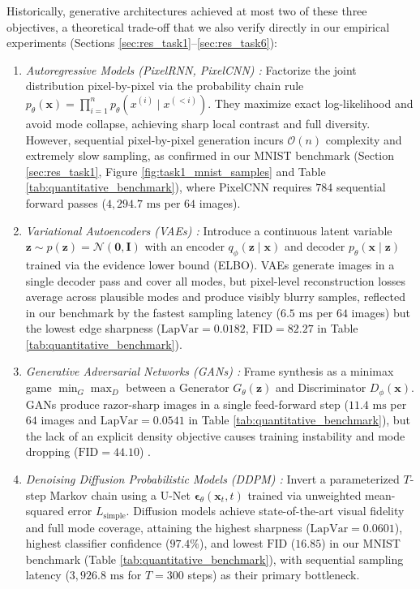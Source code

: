 \documentclass[10pt,a4paper]{article}
\begin{document}
Historically, generative architectures achieved at most two of these three objectives, a theoretical trade-off that we also verify directly in our empirical experiments (Sections \ref{sec:res_task1}--\ref{sec:res_task6}):
\begin{enumerate}[leftmargin=1.8em, itemsep=0.3em]
    \item \textit{Autoregressive Models (PixelRNN, PixelCNN) \cite{oord2016pixel, salimans2017pixelcnn}:} Factorize the joint distribution pixel-by-pixel via the probability chain rule $p_\theta(\mathbf{x}) = \prod_{i=1}^n p_\theta(x^{(i)} \mid x^{(<i)})$. They maximize exact log-likelihood and avoid mode collapse, achieving sharp local contrast and full diversity. However, sequential pixel-by-pixel generation incurs $\mathcal{O}(n)$ complexity and extremely slow sampling, as confirmed in our MNIST benchmark (Section \ref{sec:res_task1}, Figure \ref{fig:task1_mnist_samples} and Table \ref{tab:quantitative_benchmark}), where PixelCNN requires $784$ sequential forward passes ($4{,}294.7\text{ ms}$ per $64$ images).

    \item \textit{Variational Autoencoders (VAEs) \cite{kingma2014auto}:} Introduce a continuous latent variable $\mathbf{z} \sim p(\mathbf{z}) = \mathcal{N}(\mathbf{0}, \mathbf{I})$ with an encoder $q_\phi(\mathbf{z}\mid\mathbf{x})$ and decoder $p_\theta(\mathbf{x}\mid\mathbf{z})$ trained via the evidence lower bound (ELBO). VAEs generate images in a single decoder pass and cover all modes, but pixel-level reconstruction losses average across plausible modes and produce visibly blurry samples, reflected in our benchmark by the fastest sampling latency ($6.5\text{ ms}$ per $64$ images) but the lowest edge sharpness ($\text{LapVar} = 0.0182$, $\text{FID} = 82.27$ in Table \ref{tab:quantitative_benchmark}).

    \item \textit{Generative Adversarial Networks (GANs) \cite{goodfellow2014generative, radford2016unsupervised}:} Frame synthesis as a minimax game $\min_G \max_D$ between a Generator $G_\theta(\mathbf{z})$ and Discriminator $D_\phi(\mathbf{x})$. GANs produce razor-sharp images in a single feed-forward step ($11.4\text{ ms}$ per $64$ images and $\text{LapVar} = 0.0541$ in Table \ref{tab:quantitative_benchmark}), but the lack of an explicit density objective causes training instability and mode dropping ($\text{FID} = 44.10$) \cite{arjovsky2017wasserstein}.

    \item \textit{Denoising Diffusion Probabilistic Models (DDPM) \cite{sohl2015deep, ho2020denoising}:} Invert a parameterized $T$-step Markov chain using a U-Net $\bm{\epsilon}_\theta(\mathbf{x}_t, t)$ trained via unweighted mean-squared error $L_{\text{simple}}$. Diffusion models achieve state-of-the-art visual fidelity and full mode coverage, attaining the highest sharpness ($\text{LapVar} = 0.0601$), highest classifier confidence ($97.4\%$), and lowest $\text{FID}$ ($16.85$) in our MNIST benchmark (Table \ref{tab:quantitative_benchmark}), with sequential sampling latency ($3{,}926.8\text{ ms}$ for $T=300$ steps) as their primary bottleneck.


\end{enumerate}
\end{document}
